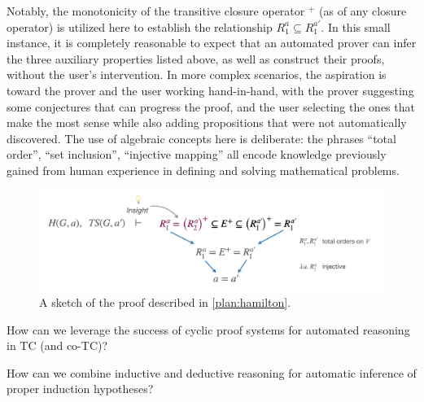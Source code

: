 \begin{example}
Notably, the monotonicity of the transitive closure operator $^+$ (as of any closure operator) is utilized here to establish the relationship $R_1^a \subseteq R_1^{a'}$.
In this small instance, it is completely reasonable to expect that an automated prover can infer the three auxiliary properties listed above, as well as construct their proofs, without the user's intervention.
In more complex scenarios, the aspiration is toward the prover and the user working hand-in-hand, with the prover suggesting some conjectures that can progress the proof, and the user selecting the ones that make the most sense while also adding propositions that were not automatically discovered.
The use of algebraic concepts here is deliberate: the phrases ``total order'', ``set inclusion'', ``injective mapping'' all encode knowledge previously gained from human experience in defining and solving mathematical problems.
\end{example}


\begin{figure}
\begin{center}
\includegraphics[width=.8\textwidth]{img/topological-and-hamilton-proof-sketch.png}
\end{center}
\vspace{-2em}
\caption{A sketch of the proof described in \autoref{plan:hamilton}.}
\label{plan:hamilton-proof}
\end{figure}


\begin{researchquestion}How can we leverage the success of cyclic proof systems for automated reasoning in TC (and co-TC)?
\end{researchquestion}


\begin{researchquestion}How can we combine inductive and deductive reasoning for automatic inference of proper induction hypotheses?
\end{researchquestion}

